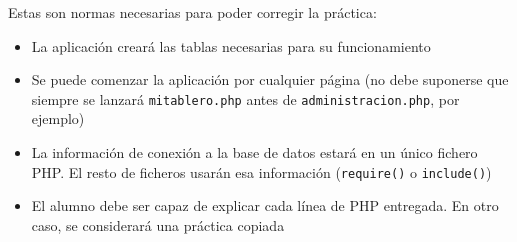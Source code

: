 \documentclass[a4paper]{article}
\begin{document}
\begin{Aviso}
Estas son normas necesarias para poder corregir la práctica:
\begin{itemize}
\item La aplicación creará las tablas necesarias para su funcionamiento
\item Se puede comenzar la aplicación por cualquier página (no debe suponerse que siempre se lanzará \texttt{mitablero.php} antes de \texttt{administracion.php}, por ejemplo)
\item La información de conexión a la base de datos estará en un único fichero PHP. El resto de ficheros usarán esa información (\texttt{require()} o \texttt{include()})
\item El alumno debe ser capaz de explicar cada línea de PHP entregada. En otro caso, se considerará una práctica copiada
\end{itemize}

\end{Aviso}
\end{document}
